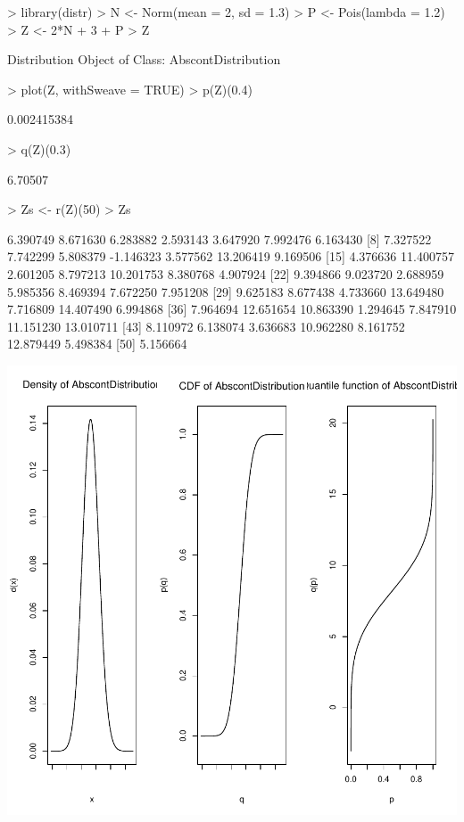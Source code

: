 \documentclass[11pt]{article}
\begin{document}
\begin{Schunk}
\begin{Sinput}
> library(distr)
> N <- Norm(mean = 2, sd = 1.3)
> P <- Pois(lambda = 1.2)
> Z <- 2*N + 3 + P
> Z
\end{Sinput}
\begin{Soutput}
Distribution Object of Class: AbscontDistribution
\end{Soutput}
\begin{Sinput}
> plot(Z, withSweave = TRUE)
> p(Z)(0.4)
\end{Sinput}
\begin{Soutput}
[1] 0.002415384
\end{Soutput}
\begin{Sinput}
> q(Z)(0.3)
\end{Sinput}
\begin{Soutput}
[1] 6.70507
\end{Soutput}
\begin{Sinput}
> Zs <- r(Z)(50)
> Zs
\end{Sinput}
\begin{Soutput}
 [1]  6.390749  8.671630  6.283882  2.593143  3.647920  7.992476  6.163430
 [8]  7.327522  7.742299  5.808379 -1.146323  3.577562 13.206419  9.169506
[15]  4.376636 11.400757  2.601205  8.797213 10.201753  8.380768  4.907924
[22]  9.394866  9.023720  2.688959  5.985356  8.469394  7.672250  7.951208
[29]  9.625183  8.677438  4.733660 13.649480  7.716809 14.407490  6.994868
[36]  7.964694 12.651654 10.863390  1.294645  7.847910 11.151230 13.010711
[43]  8.110972  6.138074  3.636683 10.962280  8.161752 12.879449  5.498384
[50]  5.156664
\end{Soutput}
\end{Schunk}
\includegraphics{distr-exam1}
\end{document}
